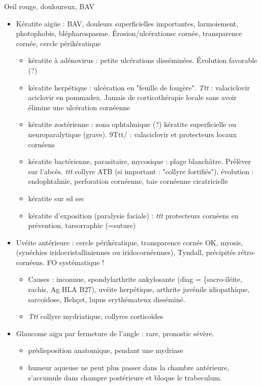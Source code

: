 \documentclass[11pt]{article}
\begin{document}
Oeil rouge, douloureux, BAV
\begin{itemize}
\item Kératite aigüe : BAV, douleurs
superficielles importantes, larmoiement, photophobie,
blépharospasme. Érosion/ulcérationsc cornée, \dec transparence cornée,
cercle périkératique
\begin{itemize}
\item kératite à adénovirus : petite ulcérations disséminées. Évolution favorable
(?)
\item kératite herpétique : ulcération en "feuille de fougère". \emph{Ttt} :
valaciclovir \textpm{} aciclovir en pommadex. Jamais de corticothérapie locale
sans avoir élimine une ulcération cornéenne \skull
\item kératite zostérienne : zona ophtalmique \thus (?) kératite superficielle ou
neuroparalytique (grave). 9Ttt/ : valaciclovir et protecteurs locaux
cornéens
\item kératite bactérienne, parasitaire, mycosique : plage blanchâtre. Prélèver
sur l'abcès. \emph{ttt} collyre ATB (si important : "collyre fortifiés"). \danger
évolution : endophtalmie, perforation cornéenne, taie cornéenne cicatricielle
\item kératite sur sd sec
\item kératite d'exposition (paralysie faciale) : \emph{ttt} protecteurs cornéens en
prévention, tarsorraphie (=suture)
\end{itemize}
\item Uvéite antérieure : cercle périkératique, transparence cornée OK, myosis,
(synéchies iridocristalliniennes ou iridocornéennes), Tyndall, précipités
rétro-cornéens. FO systématique ! 
\begin{itemize}
\item Causes : inconnue, spondylarthrite ankylosante (diag = \{sacro-iléite, rachis,
Ag HLA B27), uvéite herpétique, arthrite juvénile idiopathique, sarcoïdose,
Behçet, lupus erythémateux disséminé.
\item \emph{Ttt} collyre mydriatique, collyres corticoïdes
\end{itemize}
\item Glaucome aigu par fermeture de l'angle : rare, pronostic sévère.
\begin{itemize}
\item prédisposition anatomique, pendant une mydriase
\item humeur aqueuse ne peut plus passer dans la chambre antérieure, s'accumule
dans champre postérieure et bloque le trabeculum.

\end{itemize}
\end{itemize}
\end{document}
